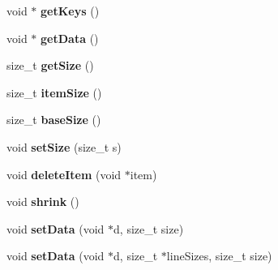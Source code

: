 \begin{DoxyCompactItemize}
\item 
\hypertarget{classfaster_1_1workerFdd_a53d7334e7b464ba4626a4682cf50dfb0}{}void $\ast$ {\bfseries get\+Keys} ()\label{classfaster_1_1workerFdd_a53d7334e7b464ba4626a4682cf50dfb0}

\item 
\hypertarget{classfaster_1_1workerFdd_a3128652ae82281ad0fdef3479d2b4014}{}void $\ast$ {\bfseries get\+Data} ()\label{classfaster_1_1workerFdd_a3128652ae82281ad0fdef3479d2b4014}

\item 
\hypertarget{classfaster_1_1workerFdd_acdedac95179fa5a2c4b88fb9c250acd6}{}size\+\_\+t {\bfseries get\+Size} ()\label{classfaster_1_1workerFdd_acdedac95179fa5a2c4b88fb9c250acd6}

\item 
\hypertarget{classfaster_1_1workerFdd_aac8ebab407dd4c0024700bb2ab7601d7}{}size\+\_\+t {\bfseries item\+Size} ()\label{classfaster_1_1workerFdd_aac8ebab407dd4c0024700bb2ab7601d7}

\item 
\hypertarget{classfaster_1_1workerFdd_a2e60538a409f44fa5fdaadcd9960508a}{}size\+\_\+t {\bfseries base\+Size} ()\label{classfaster_1_1workerFdd_a2e60538a409f44fa5fdaadcd9960508a}

\item 
\hypertarget{classfaster_1_1workerFdd_a1688e263591a30c9a715df234af3a631}{}void {\bfseries set\+Size} (size\+\_\+t s)\label{classfaster_1_1workerFdd_a1688e263591a30c9a715df234af3a631}

\item 
\hypertarget{classfaster_1_1workerFdd_ab25cae53f4ba6d2b5fbd9c0e7e1cbe06}{}void {\bfseries delete\+Item} (void $\ast$item)\label{classfaster_1_1workerFdd_ab25cae53f4ba6d2b5fbd9c0e7e1cbe06}

\item 
\hypertarget{classfaster_1_1workerFdd_ab38a9a23eff8164ce9b5c7e2bb617f99}{}void {\bfseries shrink} ()\label{classfaster_1_1workerFdd_ab38a9a23eff8164ce9b5c7e2bb617f99}

\item 
\hypertarget{classfaster_1_1workerFdd_ae22b78af425a3d3fb21af154614e8b20}{}void {\bfseries set\+Data} (void $\ast$d, size\+\_\+t size)\label{classfaster_1_1workerFdd_ae22b78af425a3d3fb21af154614e8b20}

\item 
\hypertarget{classfaster_1_1workerFdd_aeb6300f2d679b6b44693516d821c2b96}{}void {\bfseries set\+Data} (void $\ast$d, size\+\_\+t $\ast$line\+Sizes, size\+\_\+t size)\label{classfaster_1_1workerFdd_aeb6300f2d679b6b44693516d821c2b96}


\end{DoxyCompactItemize}

